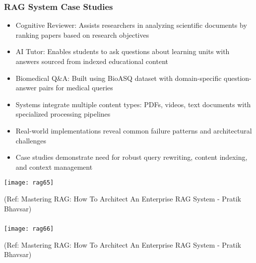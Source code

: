 \begin{frame}[fragile]\frametitle{RAG System Case Studies}
      \begin{itemize}
        \item Cognitive Reviewer: Assists researchers in analyzing scientific documents by ranking papers based on research objectives
        \item AI Tutor: Enables students to ask questions about learning units with answers sourced from indexed educational content
        \item Biomedical Q&A: Built using BioASQ dataset with domain-specific question-answer pairs for medical queries
        \item Systems integrate multiple content types: PDFs, videos, text documents with specialized processing pipelines
        \item Real-world implementations reveal common failure patterns and architectural challenges
        \item Case studies demonstrate need for robust query rewriting, content indexing, and context management
      \end{itemize}
	  
	\begin{center}
	\texttt{[image: rag65]}
	
	{\tiny (Ref: Mastering RAG: How To Architect An Enterprise RAG System - Pratik Bhavsar)}
	
	\end{center}	  
\end{frame}

\begin{frame}[fragile]\frametitle{}

	\begin{center}
	\texttt{[image: rag66]}
	
	{\tiny (Ref: Mastering RAG: How To Architect An Enterprise RAG System - Pratik Bhavsar)}
	
	\end{center}
	
	
\end{frame}

